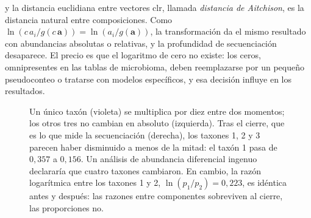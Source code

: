 y la distancia euclidiana entre vectores clr, llamada \emph{distancia de Aitchison}, es la distancia natural entre composiciones. Como $\ln(c\,a_i / g(c\,\mathbf{a})) = \ln(a_i/g(\mathbf{a}))$, la transformación da el mismo resultado con abundancias absolutas o relativas, y la profundidad de secuenciación desaparece. El precio es que el logaritmo de cero no existe: los ceros, omnipresentes en las tablas de microbioma, deben reemplazarse por un pequeño pseudoconteo o tratarse con modelos específicos, y esa decisión influye en los resultados.

\begin{figure}[t]
\centering
{}
\caption[El efecto del cierre composicional]{Un único taxón (violeta) se multiplica por diez entre dos momentos; los otros tres no cambian en absoluto (izquierda). Tras el cierre, que es lo que mide la secuenciación (derecha), los taxones 1, 2 y 3 parecen haber disminuido a menos de la mitad: el taxón 1 pasa de $0{,}357$ a $0{,}156$. Un análisis de abundancia diferencial ingenuo declararía que cuatro taxones cambiaron. En cambio, la razón logarítmica entre los taxones 1 y 2, $\ln(p_1/p_2) = 0{,}223$, es idéntica antes y después: las razones entre componentes sobreviven al cierre, las proporciones no.}
\label{fig:14-compos}
\end{figure}


